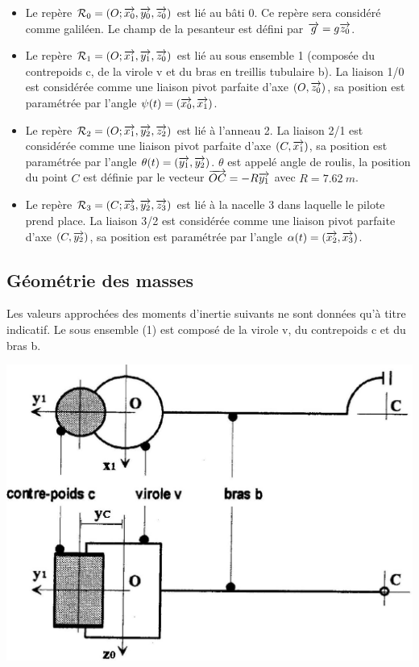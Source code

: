\documentclass[10pt,fleqn]{article} %
\begin{document}
\begin{multicols}{2}
\begin{itemize}
\item Le repère $\mathcal{R}_{0}=\left(O;\overrightarrow{x_0},\overrightarrow{y_0},\overrightarrow{z_0} \right)$ est lié au bâti 0. Ce repère sera considéré comme galiléen. Le champ de la pesanteur est défini par $\overrightarrow{g}=g\overrightarrow{z_0}$.
\item Le repère $\mathcal{R}_{1}=\left(O;\overrightarrow{x_1},\overrightarrow{y_1},\overrightarrow{z_0} \right)$ est lié au sous ensemble 1 (composée du contrepoids c, de la virole v et du bras en treillis tubulaire b). La liaison 1/0 est considérée comme une liaison pivot parfaite d’axe $\left(O,\overrightarrow{z_0}\right)$, sa position est paramétrée par l’angle $\psi(t)=\left(\overrightarrow{x_0},\overrightarrow{x_1}\right)$.
\item Le repère $\mathcal{R}_{2}=\left(O;\overrightarrow{x_1},\overrightarrow{y_2},\overrightarrow{z_2} \right)$ est lié à l'anneau 2. La liaison 2/1 est considérée comme une liaison pivot parfaite d’axe $\left(C,\overrightarrow{x_1}\right)$, sa position est paramétrée par l’angle $\theta(t)=\left(\overrightarrow{y_1},\overrightarrow{y_2}\right)$. $\theta$ est appelé angle de roulis, la position du point $C$ est définie par le vecteur $\overrightarrow{OC}=-R\overrightarrow{y_1}$ avec $R=\SI{7,62}{m}$. 
\item Le repère $\mathcal{R}_{3}=\left(C;\overrightarrow{x_3},\overrightarrow{y_2},\overrightarrow{z_3} \right)$ est lié à la nacelle 3 dans laquelle le pilote prend place. La liaison 3/2 est considérée comme une liaison pivot parfaite d’axe $\left(C,\overrightarrow{y_2}\right)$, sa position est paramétrée par l’angle $\alpha(t)=\left(\overrightarrow{x_2},\overrightarrow{x_3}\right)$.
\end{itemize}

\subsection*{Géométrie des masses}
Les valeurs approchées des moments d’inertie suivants ne sont données qu’à titre indicatif. Le sous ensemble (1) est composé de la virole v, du contrepoids c et du bras b. 

\begin{center}
\includegraphics[width=\linewidth]{images/fig_03.png}
\end{center}



\end{multicols}
\end{document}
